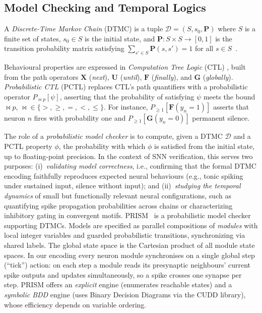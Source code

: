 \documentclass[runningheads]{llncs}
\begin{document}
\subsection{Model Checking and Temporal Logics}\label{sec:model-checking}

\begin{definition}
A \emph{Discrete-Time Markov Chain} (DTMC) is a tuple
$\mathcal{D} = (S, s_0, \mathbf{P})$ where $S$ is a finite set of states,
$s_0 \in S$ is the initial state, and $\mathbf{P} : S \times S \to [0, 1]$ is the
transition probability matrix satisfying $\sum_{s' \in S} \mathbf{P}(s, s') = 1$
for all $s \in S$~\cite{BaierKatoen2008}.
\end{definition}

Behavioural properties are expressed in \emph{Computation Tree Logic} (CTL)
\cite{BaierKatoen2008}, built from the path operators $\mathbf{X}$
(\emph{next}), $\mathbf{U}$ (\emph{until}), $\mathbf{F}$ (\emph{finally}), and
$\mathbf{G}$ (\emph{globally}). \emph{Probabilistic CTL} (PCTL)
\cite{hansson1994logic} replaces CTL's path quantifiers with a probabilistic
operator $P_{\bowtie p}[\psi]$, asserting that the probability of satisfying
$\psi$ meets the bound $\bowtie p$, $\bowtie \in \{>, \geq, =, <, \leq\}$. For
instance, $P_{\geq 1}[\mathbf{F}(y_n = 1)]$ asserts that neuron $n$ fires with
probability one and $P_{\geq 1}[\mathbf{G}(y_n = 0)]$ permanent silence.

The role of a \emph{probabilistic model checker} is to compute, given a DTMC
$\mathcal{D}$ and a PCTL property $\phi$, the probability with which $\phi$ is
satisfied from the initial state, up to floating-point precision. In the context
of SNN verification, this serves two purposes: (i)~\emph{validating model
correctness}, i.e., confirming that the formal DTMC encoding faithfully
reproduces expected neural behaviours (e.g., tonic spiking under sustained input,
silence without input); and (ii)~\emph{studying the temporal dynamics} of small
but functionally relevant neural configurations, such as quantifying spike
propagation probabilities across chains or characterizing inhibitory gating in
convergent motifs. PRISM~\cite{PRISM2011} is a probabilistic model checker
supporting DTMCs. Models are specified as parallel compositions of \emph{modules}
with local integer variables and guarded probabilistic transitions,
synchronizing via shared labels. The global state space is the Cartesian product
of all module state spaces. In our encoding every neuron module synchronises on
a single global step (``tick'') action: on each step a module reads its
presynaptic neighbours' current spike outputs and updates simultaneously, so a
spike crosses one synapse per step. PRISM offers an \emph{explicit} engine
(enumerates reachable states) and a \emph{symbolic BDD} engine (uses Binary
Decision Diagrams via the CUDD library), whose efficiency depends on variable
ordering.
\end{document}
